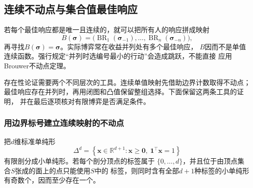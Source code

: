 \subsection{连续不动点与集合值最佳响应}

若每个最佳响应都是唯一且连续的，就可以把所有人的响应拼成映射
\[
  B(\bm{\sigma})
  =
  \bigl(
    \operatorname{BR}_1(\bm{\sigma}_{-1}),\ldots,
    \operatorname{BR}_n(\bm{\sigma}_{-n})
  \bigr),
\]
再寻找\(B(\bm{\sigma})=\bm{\sigma}\)。实际博弈常在收益并列处有多个最佳响应，
\(B\)因而不是单值连续函数。强行规定“并列时选编号最小的行动”会造成跳跃，不能直接
应用Brouwer不动点定理。

存在性论证需要两个不同层次的工具。连续单值映射先借助边界计数取得不动点；
最佳响应存在并列时，再用闭图和凸值保留整组选择。下面保留这两条工具的证明，
并在最后逐项核对有限博弈是否满足条件。

\subsubsection{用边界标号建立连续映射的不动点}

\begin{lemma}[Sperner引理]
\label{lem:game-sperner}
把\(d\)维标准单纯形
\[
  \Delta^d
  =
  \left\{
    \bm{x}\in\mathbb{R}^{d+1}:
    \bm{x}\geq\bm{0},\
    \bm{1}^{\top}\bm{x}=1
  \right\}
\]
有限剖分成小单纯形。若每个剖分顶点的标签属于
\(\{0,\ldots,d\}\)，并且位于由顶点集合\(S\)张成的面上的点只能使用\(S\)中的
标签，则同时含有全部\(d+1\)种标签的小单纯形有奇数个，因而至少存在一个。
\end{lemma}

